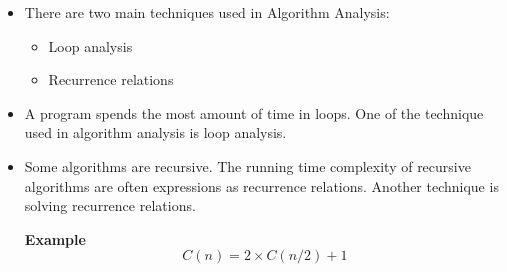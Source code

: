 \documentclass[12pt, a4paper]{article}
\newenvironment*{eg}{\par\begin{tcolorbox}\noindent\textbf{Example}\quad}{\end{tcolorbox}\par}
\begin{document}
\begin{itemize}
	\begin{itemize}
		\item There are two main techniques used in Algorithm Analysis: 
		\begin{itemize}
			\item Loop analysis
			\item Recurrence relations
		\end{itemize}
		\item A program spends the most amount of time in loops. One of the technique used in algorithm analysis is loop analysis.
		\item Some algorithms are recursive. The running time complexity of recursive algorithms are often expressions as recurrence relations. Another technique is solving recurrence relations. \begin{eg}\[C(n)=2\times C(n/2)+1\]\end{eg}	

	\end{itemize}
\end{itemize}
\end{document}
